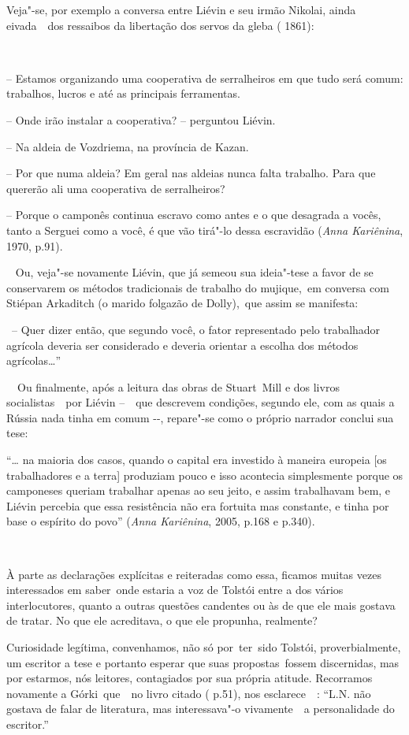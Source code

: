 Veja"-se, por exemplo a conversa entre Liévin e seu irmão Nikolai, ainda
eivada~~dos ressaibos da libertação dos servos da gleba ( 1861):

~

-- Estamos organizando uma cooperativa de serralheiros em que tudo será
comum: trabalhos, lucros e até as principais ferramentas.

-- Onde irão instalar a cooperativa? -- perguntou Liévin.

-- Na aldeia de Vozdriema, na província de Kazan.

-- Por que numa aldeia? Em geral nas aldeias nunca falta trabalho. Para
que quererão ali uma cooperativa de serralheiros?

-- Porque o camponês continua escravo como antes e o que desagrada a
vocês, tanto a Serguei como a você, é que vão tirá"-lo dessa escravidão
(\emph{Anna Kariênina}, 1970, p.91).

\emph{~} Ou, veja"-se novamente Liévin, que já semeou sua ideia"-tese a
favor de se conservarem os métodos tradicionais de trabalho do
mujique,~em conversa com Stiépan Arkaditch (o marido folgazão de
Dolly),~que assim se manifesta:

~-- Quer dizer então, que segundo você, o fator representado pelo
trabalhador agrícola deveria ser considerado e deveria orientar a
escolha dos métodos agrícolas\ldots{}''

~~Ou finalmente, após a leitura das obras de Stuart~Mill e dos livros
socialistas~~por Liévin --~~que descrevem condições, segundo ele, com as
quais a Rússia nada tinha em comum -\/-, repare"-se como o próprio
narrador conclui sua tese:

``\ldots{} na maioria dos casos, quando o capital era investido à maneira
europeia {[}os trabalhadores e a terra{]} produziam pouco e isso
acontecia simplesmente porque os camponeses queriam trabalhar apenas ao
seu jeito, e assim trabalhavam bem, e Liévin percebia que essa
resistência não era fortuita mas constante, e tinha por base o espírito
do povo'' (\emph{Anna Kariênina}, 2005, p.168 e p.340).

~

À parte as declarações explícitas e reiteradas como essa, ficamos muitas
vezes interessados em saber~onde estaria a voz de Tolstói entre a dos
vários interlocutores, quanto a outras questões candentes ou às de que
ele mais gostava de tratar. No que ele acreditava, o que ele propunha,
realmente?

Curiosidade legítima, convenhamos, não só por~ter~sido Tolstói,
proverbialmente, um escritor a tese e portanto esperar que suas
propostas~fossem discernidas, mas por estarmos, nós leitores,
contagiados por sua própria atitude. Recorramos novamente a
Górki~que~~no livro citado ( p.51), nos esclarece~~: ``L.N. não gostava
de falar de literatura, mas interessava"-o vivamente~~a personalidade do
escritor.''

